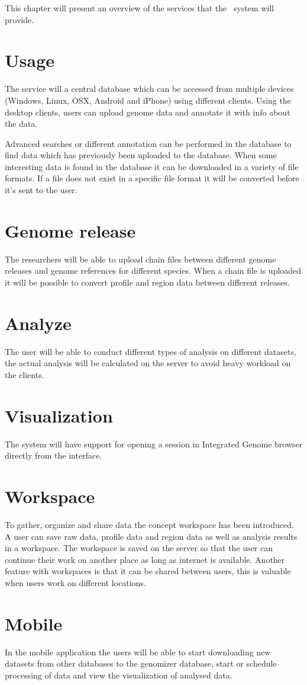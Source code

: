 This chapter will present an overview of the services that the \appName\ system will provide. 

\section{Usage}
The service will a central database which can be accessed from multiple devices (Windows, Linux, OSX, Android and iPhone) using different clients. Using the desktop clients, users can upload genome data and annotate it with info about the data.   

Advanced searches or different annotation can be performed in the database to find data which has previously been uploaded to the database. When some interesting data is found in the database it can be downloaded in a variety of file formats. If a file does not exist in a specific file format it will be converted before it's sent to the user.

\section{Genome release}
The researchers will be able to upload chain files between different genome releases and genome references for different species. When a chain file is uploaded it will be possible to convert profile and region data between different releases.

\section{Analyze}
The user will be able to conduct different types of analysis on different datasets, the actual analysis will be calculated on the server to avoid heavy workload on the clients.

\section{Visualization}
The system will have support for opening a session in Integrated Genome browser directly from the interface.

\section{Workspace}
To gather, organize and share data the concept workspace has been introduced. A user can save raw data, profile data and region data as well as analysis results in a workspace. The workspace is saved on  the server so that the user can continue their work on another place as long as internet is available.  Another feature with workspaces is that it can be shared between users, this is valuable when users work on different locations.

\section{Mobile}
In the mobile application the users will be able to start downloading new datasets from other databases to the genomizer database, start or schedule processing of data and view the visualization of analysed data.
